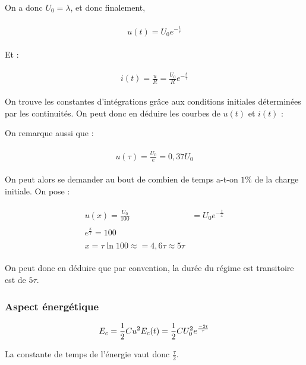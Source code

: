 \documentclass{article}
\begin{document}
On a donc $U_0=\lambda$, et donc finalement,

\begin{align*}\begin{split}
u(t)=U_0e^{-\frac{t}{\tau}}
\end{split}\end{align*}

Et :

\begin{align*}\begin{split}
i(t)=\frac{u}{R}=\frac{U_0}{R}e^{-\frac{t}{\tau}}
\end{split}\end{align*}

On trouve les constantes d'intégrations grâce aux conditions initiales déterminées par les continuités. On peut donc en déduire les courbes de $u(t)$ et $i(t)$ :


On remarque aussi que :

\begin{align*}\begin{split}
u(\tau)=\frac{U_0}{e}=0,37U_0
\end{split}\end{align*}

On peut alors se demander au bout de combien de temps a-t-on $1\%$ de la charge initiale. On pose :

\begin{align*}\begin{split}
u(x)=\frac{U_0}{100}&=U_0e^{-\frac{t}{x}}\\\\
e^{\frac{x}{\tau}}=100\\\\
x=\tau\ln100\approx=4,6\tau\approx 5\tau
\end{split}\end{align*}

On peut donc en déduire que par convention, la durée du régime est transitoire est de $5\tau$.

\subsubsection{Aspect énergétique}

$$E_c = \frac{1}{2}Cu^2\\E_c(t)=\frac{1}{2}CU_0^2e^{\frac{-2t}{\tau}}$$


La constante de temps de l'énergie vaut donc $\frac{\tau}{2}$.
\end{document}
